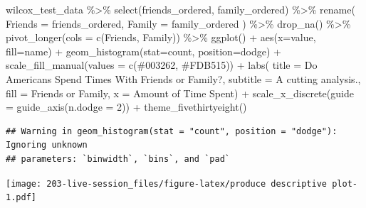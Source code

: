 \documentclass[
]{book}
\newenvironment{Shaded}{\begin{snugshade}}{\end{snugshade}}
\newcommand{\AttributeTok}[1]{\textcolor[rgb]{0.77,0.63,0.00}{#1}}
\newcommand{\DecValTok}[1]{\textcolor[rgb]{0.00,0.00,0.81}{#1}}
\newcommand{\FunctionTok}[1]{\textcolor[rgb]{0.00,0.00,0.00}{#1}}
\newcommand{\NormalTok}[1]{#1}
\newcommand{\SpecialCharTok}[1]{\textcolor[rgb]{0.00,0.00,0.00}{#1}}
\newcommand{\StringTok}[1]{\textcolor[rgb]{0.31,0.60,0.02}{#1}}
\theoremstyle{definition}
\theoremstyle{definition}
\theoremstyle{definition}
\theoremstyle{definition}
\theoremstyle{remark}
\begin{document}
\begin{Shaded}
\begin{Highlighting}[]
\NormalTok{wilcox\_test\_data }\SpecialCharTok{\%\textgreater{}\%} 
  \FunctionTok{select}\NormalTok{(friends\_ordered, family\_ordered) }\SpecialCharTok{\%\textgreater{}\%} 
  \FunctionTok{rename}\NormalTok{(}
    \AttributeTok{Friends =}\NormalTok{ friends\_ordered, }
    \AttributeTok{Family  =}\NormalTok{ family\_ordered}
\NormalTok{  ) }\SpecialCharTok{\%\textgreater{}\%} 
  \FunctionTok{drop\_na}\NormalTok{() }\SpecialCharTok{\%\textgreater{}\%} 
  \FunctionTok{pivot\_longer}\NormalTok{(}\AttributeTok{cols =} \FunctionTok{c}\NormalTok{(Friends, Family)) }\SpecialCharTok{\%\textgreater{}\%}   
  \FunctionTok{ggplot}\NormalTok{() }\SpecialCharTok{+} 
    \FunctionTok{aes}\NormalTok{(}\AttributeTok{x=}\NormalTok{value, }\AttributeTok{fill=}\NormalTok{name) }\SpecialCharTok{+} 
    \FunctionTok{geom\_histogram}\NormalTok{(}\AttributeTok{stat=}\StringTok{\textquotesingle{}count\textquotesingle{}}\NormalTok{, }\AttributeTok{position=}\StringTok{\textquotesingle{}dodge\textquotesingle{}}\NormalTok{) }\SpecialCharTok{+} 
  \FunctionTok{scale\_fill\_manual}\NormalTok{(}\AttributeTok{values =} \FunctionTok{c}\NormalTok{(}\StringTok{\textquotesingle{}\#003262\textquotesingle{}}\NormalTok{, }\StringTok{\textquotesingle{}\#FDB515\textquotesingle{}}\NormalTok{)) }\SpecialCharTok{+} 
  \FunctionTok{labs}\NormalTok{(}
    \AttributeTok{title =} \StringTok{\textquotesingle{}Do Americans Spend Times With Friends or Family?\textquotesingle{}}\NormalTok{,}
    \AttributeTok{subtitle =} \StringTok{\textquotesingle{}A cutting analysis.\textquotesingle{}}\NormalTok{, }
    \AttributeTok{fill =} \StringTok{\textquotesingle{}Friends or Family\textquotesingle{}}\NormalTok{, }
    \AttributeTok{x =} \StringTok{\textquotesingle{}Amount of Time Spent\textquotesingle{}}\NormalTok{) }\SpecialCharTok{+} 
  \FunctionTok{scale\_x\_discrete}\NormalTok{(}\AttributeTok{guide =} \FunctionTok{guide\_axis}\NormalTok{(}\AttributeTok{n.dodge =} \DecValTok{2}\NormalTok{)) }\SpecialCharTok{+}
  \FunctionTok{theme\_fivethirtyeight}\NormalTok{()}
\end{Highlighting}
\end{Shaded}

\begin{verbatim}
## Warning in geom_histogram(stat = "count", position = "dodge"): Ignoring unknown
## parameters: `binwidth`, `bins`, and `pad`
\end{verbatim}

\texttt{[image: 203-live-session\_files/figure-latex/produce descriptive plot-1.pdf]}
\end{document}
